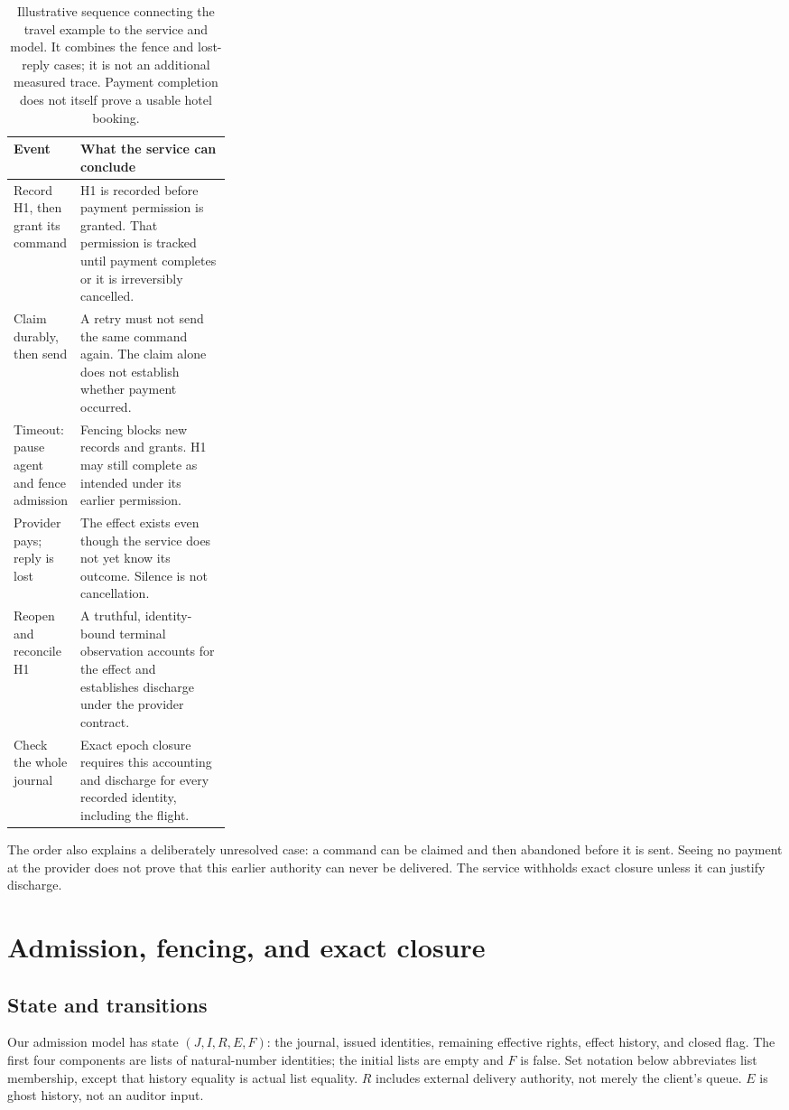 \documentclass[11pt]{article}
\begin{document}
\begin{table}[ht]
\centering\small
\begin{tabularx}{\linewidth}{@{}>{\raggedright\arraybackslash}p{0.28\linewidth} X@{}}
\toprule
Event & What the service can conclude \\
\midrule
Record H1, then grant its command & H1 is recorded before payment permission is granted. That permission is tracked until payment completes or it is irreversibly cancelled. \\
Claim durably, then send & A retry must not send the same command again. The claim alone does not establish whether payment occurred. \\
Timeout: pause agent and fence admission & Fencing blocks new records and grants. H1 may still complete as intended under its earlier permission. \\
Provider pays; reply is lost & The effect exists even though the service does not yet know its outcome. Silence is not cancellation. \\
Reopen and reconcile H1 & A truthful, identity-bound terminal observation accounts for the effect and establishes discharge under the provider contract. \\
Check the whole journal & Exact epoch closure requires this accounting and discharge for every recorded identity, including the flight. \\
\bottomrule
\end{tabularx}
\caption{Illustrative sequence connecting the travel example to the service
and model. It combines the fence and lost-reply cases; it is not an additional
measured trace. Payment completion does not itself prove a usable hotel booking.}
\label{tab:hotel}
\end{table}

The order also explains a deliberately unresolved case: a command can be
claimed and then abandoned before it is sent. Seeing no payment at the provider
does not prove that this earlier authority can never be delivered. The service
withholds exact closure unless it can justify discharge.

\section{Admission, fencing, and exact closure}
\label{sec:theorem}
\subsection{State and transitions}
Our admission model has state $(J,I,R,E,F)$: the journal, issued identities, remaining
effective rights, effect history, and closed flag. The first four components
are lists of natural-number identities; the initial lists are empty and $F$ is
false. Set notation below abbreviates list membership, except that history
equality is actual list equality. $R$ includes external delivery authority,
not merely the client's queue. $E$ is ghost history, not an auditor input.
\end{document}

